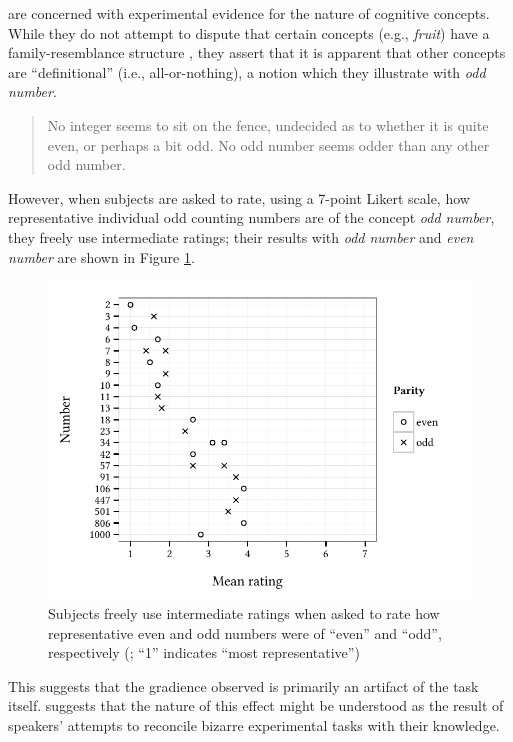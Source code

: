 \citet{Armstrong1983} are concerned with experimental evidence for the nature of cognitive concepts. 
While they do not attempt to dispute that certain concepts (e.g., \emph{fruit}) have a family-resemblance structure \citep[e.g.,][]{Rosch1975a}, they assert that it is apparent that other concepts are ``definitional'' (i.e., all-or-nothing), a notion which they illustrate with \emph{odd number}.

\begin{quote}
No integer seems to sit on the fence, undecided as to whether it is quite even, or perhaps a bit odd. No odd number seems odder than any other odd number. \citep[274]{Armstrong1983}
\end{quote}

\noindent
However, when subjects are asked to rate, using a 7-point Likert scale, how representative individual odd counting numbers are of the concept \emph{odd number}, they freely use intermediate ratings; their results with \emph{odd number} and \emph{even number} are shown in Figure \ref{agg}.

\begin{figure}[ht]
\centering
\includegraphics{agg.pdf}
\caption{Subjects freely use intermediate ratings when asked to rate how representative even and odd numbers were of ``even'' and ``odd'', respectively (\citealp{Armstrong1983}; ``1'' indicates ``most representative'')}
\label{agg}
\end{figure}

This suggests that the gradience observed is primarily an artifact of the task itself. \citeauthor{Schutze2011} suggests that the nature of this effect might be understood as the result of speakers' attempts to reconcile bizarre experimental tasks with their knowledge.

